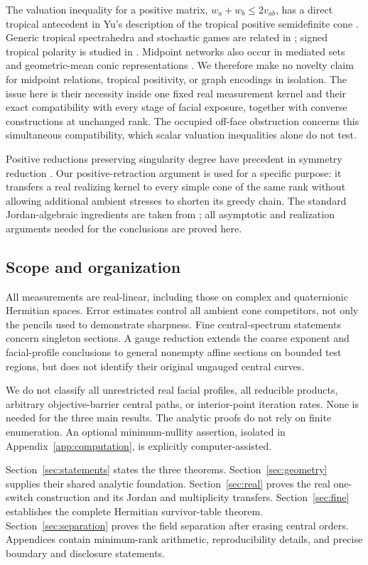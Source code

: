 The valuation inequality for a positive matrix, $w_a+w_b\le2v_{ab}$, has a direct tropical antecedent in Yu's description of the tropical positive semidefinite cone \cite{Yu15}. Generic tropical spectrahedra and stochastic games are related in \cite{AGS18}; signed tropical polarity is studied in \cite{AAGS25}. Midpoint networks also occur in mediated sets and geometric-mean conic representations \cite{Wang24,BMA26}. We therefore make no novelty claim for midpoint relations, tropical positivity, or graph encodings in isolation. The issue here is their necessity inside one fixed real measurement kernel and their exact compatibility with every stage of facial exposure, together with converse constructions at unchanged rank. The occupied off-face obstruction concerns this simultaneous compatibility, which scalar valuation inequalities alone do not test.

Positive reductions preserving singularity degree have precedent in symmetry reduction \cite{HSW23}. Our positive-retraction argument is used for a specific purpose: it transfers a real realizing kernel to every simple cone of the same rank without allowing additional ambient stresses to shorten its greedy chain. The standard Jordan-algebraic ingredients are taken from \cite{FK94}; all asymptotic and realization arguments needed for the conclusions are proved here.

\subsection{Scope and organization}
All measurements are real-linear, including those on complex and quaternionic Hermitian spaces. Error estimates control all ambient cone competitors, not only the pencils used to demonstrate sharpness. Fine central-spectrum statements concern singleton sections. A gauge reduction extends the coarse exponent and facial-profile conclusions to general nonempty affine sections on bounded test regions, but does not identify their original ungauged central curves.

We do not classify all unrestricted real facial profiles, all reducible products, arbitrary objective-barrier central paths, or interior-point iteration rates. None is needed for the three main results. The analytic proofs do not rely on finite enumeration. An optional minimum-nullity assertion, isolated in Appendix~\ref{app:computation}, is explicitly computer-assisted.

Section~\ref{sec:statements} states the three theorems. Section~\ref{sec:geometry} supplies their shared analytic foundation. Section~\ref{sec:real} proves the real one-switch construction and its Jordan and multiplicity transfers. Section~\ref{sec:fine} establishes the complete Hermitian survivor-table theorem. Section~\ref{sec:separation} proves the field separation after erasing central orders. Appendices contain minimum-rank arithmetic, reproducibility details, and precise boundary and disclosure statements.


